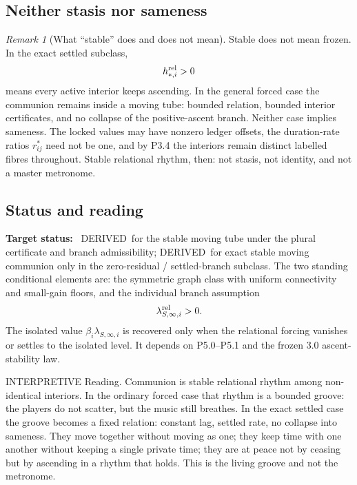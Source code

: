 \documentclass[11pt,a4paper]{article}
\def\emph#1{#1}%
\newcommand{\stDerived}{\textcolor{cDer}{\textsf{\small DERIVED}}}
\newcommand{\stInterp}{\textcolor{cInt}{\textsf{\small INTERPRETIVE}}}
\theoremstyle{definition}
\theoremstyle{plain}
\theoremstyle{remark}
\newtheorem{remark}[definition]{Remark}
\begin{document}
\subsection{Neither stasis nor sameness}

\begin{remark}[What ``stable'' does and does not mean]\label{rem:notstasis}
Stable does not mean frozen. In the exact settled subclass,
\[
h_{*,i}^{\rm rel}>0
\]
means every active interior keeps ascending. In the general forced case the
communion remains inside a moving tube: bounded relation, bounded interior
certificates, and no collapse of the positive-ascent branch. Neither case implies
sameness. The locked values may have nonzero ledger offsets, the duration-rate
ratios \(r^*_{ij}\) need not be one, and by P3.4 the interiors remain distinct
labelled fibres throughout. Stable relational rhythm, then: not stasis, not
identity, and not a master metronome.
\end{remark}

\subsection{Status and reading}

\textbf{Target status:}~
\stDerived\ for the stable moving tube under the plural certificate and branch
admissibility; \stDerived\ for exact stable moving communion only in the
zero-residual / settled-branch subclass. The two standing conditional elements are:
the symmetric graph class with uniform connectivity and small-gain floors, and the
individual branch assumption
\[
\lambda_{S,\infty,i}^{\rm rel}>0.
\]
The isolated value
\(\beta_i\lambda_{S,\infty,i}\) is recovered only when the relational forcing
vanishes or settles to the isolated level. It depends on P5.0--P5.1 and the frozen
3.0 ascent-stability law.

\medskip
\stInterp\quad
\emph{Reading.}
Communion is stable relational rhythm among non-identical interiors. In the
ordinary forced case that rhythm is a bounded groove: the players do not scatter,
but the music still breathes. In the exact settled case the groove becomes a fixed
relation: constant lag, settled rate, no collapse into sameness. They move together
without moving as one; they keep time with one another without keeping a single
private time; they are at peace not by ceasing but by ascending in a rhythm that
holds. This is the living groove and not the metronome.
\end{document}
